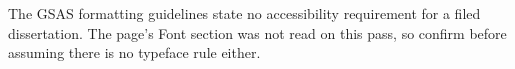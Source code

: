 %
%


%


	{The GSAS formatting guidelines state no accessibility requirement for a
	 filed dissertation. The page's Font section was not read on this pass, so
	 confirm before assuming there is no typeface rule either.}
